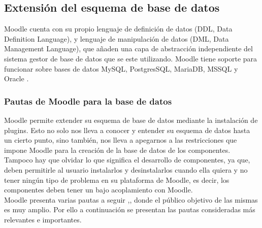 
\subsection{Extensión del esquema de base de datos}

 Moodle cuenta con su propio lenguaje de definición de datos (DDL, Data Definition
 Language), y lenguaje de manipulación de datos (DML, Data Management Language), que añaden
 una capa de abstracción independiente del sistema gestor de base de datos que se este
 utilizando. Moodle tiene soporte para funcionar sobre bases de datos MySQL, PostgresSQL,
 MariaDB, MSSQL y Oracle \cite{moodleInstall}.

\subsubsection{Pautas de Moodle para la base de datos}

Moodle permite extender su esquema de base de datos mediante la instalación de plugins. Esto no solo nos lleva a conocer y entender su esquema de datos hasta un cierto punto, sino también, nos lleva a apegarnos a las restricciones que impone Moodle para la creación de la base de datos de los componentes.\\

    \noindent Tampoco hay que olvidar lo que significa el desarrollo de componentes, ya que, deben permitirle al usuario instalarlos y desinstalarlos cuando ella quiera y no tener ningún tipo de problema en su plataforma de Moodle, es decir, los componentes deben tener un bajo acoplamiento \cite[pp. 244-245]{defAcoplamiento} con Moodle.\\

    \noindent Moodle presenta varias pautas a seguir \cite{moodlePautasBD1},\cite{ moodlePautasBD2}, donde el público objetivo de las mismas es muy amplio. Por ello a continuación se presentan las pautas consideradas más relevantes e importantes.

